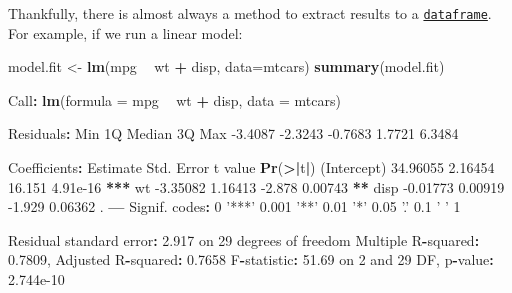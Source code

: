 \documentclass[]{article}
\newenvironment{Shaded}{\begin{snugshade}}{\end{snugshade}}
\newcommand{\DataTypeTok}[1]{\textcolor[rgb]{0.13,0.29,0.53}{#1}}
\newcommand{\DecValTok}[1]{\textcolor[rgb]{0.00,0.00,0.81}{#1}}
\newcommand{\ErrorTok}[1]{\textcolor[rgb]{0.64,0.00,0.00}{\textbf{#1}}}
\newcommand{\FloatTok}[1]{\textcolor[rgb]{0.00,0.00,0.81}{#1}}
\newcommand{\KeywordTok}[1]{\textcolor[rgb]{0.13,0.29,0.53}{\textbf{#1}}}
\newcommand{\NormalTok}[1]{#1}
\newcommand{\OperatorTok}[1]{\textcolor[rgb]{0.81,0.36,0.00}{\textbf{#1}}}
\newcommand{\StringTok}[1]{\textcolor[rgb]{0.31,0.60,0.02}{#1}}
\begin{document}
Thankfully, there is almost always a method to extract results to a
\protect\hyperlink{datasets-dataframes}{\texttt{dataframe}}. For example, if we run a linear model:

\begin{Shaded}
\begin{Highlighting}[]
\NormalTok{model.fit <-}\StringTok{ }\KeywordTok{lm}\NormalTok{(mpg }\OperatorTok{~}\StringTok{ }\NormalTok{wt }\OperatorTok{+}\StringTok{ }\NormalTok{disp, }\DataTypeTok{data=}\NormalTok{mtcars)}
\KeywordTok{summary}\NormalTok{(model.fit)}

\NormalTok{Call}\OperatorTok{:}
\KeywordTok{lm}\NormalTok{(}\DataTypeTok{formula =}\NormalTok{ mpg }\OperatorTok{~}\StringTok{ }\NormalTok{wt }\OperatorTok{+}\StringTok{ }\NormalTok{disp, }\DataTypeTok{data =}\NormalTok{ mtcars)}

\NormalTok{Residuals}\OperatorTok{:}
\StringTok{    }\NormalTok{Min      1Q  Median      3Q     Max }
\FloatTok{-3.4087} \FloatTok{-2.3243} \FloatTok{-0.7683}  \FloatTok{1.7721}  \FloatTok{6.3484} 

\NormalTok{Coefficients}\OperatorTok{:}
\StringTok{            }\NormalTok{Estimate Std. Error t value }\KeywordTok{Pr}\NormalTok{(}\OperatorTok{>}\ErrorTok{|}\NormalTok{t}\OperatorTok{|}\NormalTok{)    }
\NormalTok{(Intercept) }\FloatTok{34.96055}    \FloatTok{2.16454}  \FloatTok{16.151} \FloatTok{4.91e-16} \OperatorTok{**}\ErrorTok{*}
\NormalTok{wt          }\FloatTok{-3.35082}    \FloatTok{1.16413}  \FloatTok{-2.878}  \FloatTok{0.00743} \OperatorTok{**}\StringTok{ }
\NormalTok{disp        }\FloatTok{-0.01773}    \FloatTok{0.00919}  \FloatTok{-1.929}  \FloatTok{0.06362}\NormalTok{ .  }
\OperatorTok{---}
\NormalTok{Signif. codes}\OperatorTok{:}\StringTok{  }\DecValTok{0} \StringTok{'***'} \FloatTok{0.001} \StringTok{'**'} \FloatTok{0.01} \StringTok{'*'} \FloatTok{0.05} \StringTok{'.'} \FloatTok{0.1} \StringTok{' '} \DecValTok{1}

\NormalTok{Residual standard error}\OperatorTok{:}\StringTok{ }\FloatTok{2.917}\NormalTok{ on }\DecValTok{29}\NormalTok{ degrees of freedom}
\NormalTok{Multiple R}\OperatorTok{-}\NormalTok{squared}\OperatorTok{:}\StringTok{  }\FloatTok{0.7809}\NormalTok{,    Adjusted R}\OperatorTok{-}\NormalTok{squared}\OperatorTok{:}\StringTok{  }\FloatTok{0.7658} 
\NormalTok{F}\OperatorTok{-}\NormalTok{statistic}\OperatorTok{:}\StringTok{ }\FloatTok{51.69}\NormalTok{ on }\DecValTok{2}\NormalTok{ and }\DecValTok{29}\NormalTok{ DF,  p}\OperatorTok{-}\NormalTok{value}\OperatorTok{:}\StringTok{ }\FloatTok{2.744e-10}
\end{Highlighting}
\end{Shaded}
\end{document}
